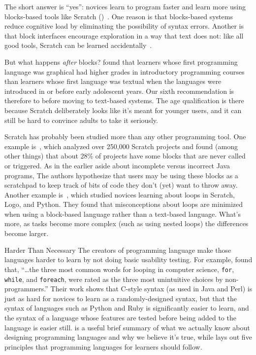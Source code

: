 
The short answer is ``yes'':
novices learn to program faster and learn more
using blocks-based tools like Scratch ()~\cite{Wein2017}.
One reason is that blocks-based systems reduce cognitive load by eliminating the possibility of syntax errors.
Another is that block interfaces encourage exploration in a way that text does not:
like all good tools,
Scratch can be learned accidentally~\cite{Malo2010}.

But what happens \emph{after} blocks?
\cite{Chen2018} found that learners whose first programming language was graphical
had higher grades in introductory programming courses
than learners whose first language was textual
when the languages were introduced in or before early adolescent years.
Our sixth recommendation is therefore to
before moving to text-based systems.
The age qualification is there because Scratch deliberately looks like it's meant for younger users,
and it can still be hard to convince adults to take it seriously.


Scratch has probably been studied more than any other programming tool.
One example is~\cite{Aiva2016},
which analyzed over 250,000 Scratch projects
and found (among other things) that about 28\% of projects have some blocks that are never called or triggered.
As in the earlier aside about incomplete versus incorrect Java programs,
The authors hypothesize that users may be using these blocks as a scratchpad
to keep track of bits of code they don't (yet) want to throw away.
Another example is~\cite{Grov2017,Mlad2017},
which studied novices learning about loops in Scratch, Logo, and Python.
They found that misconceptions about loops are minimized when using a block-based language
rather than a text-based language.
What's more,
as tasks become more complex (such as using nested loops)
the differences become larger.

\begin{aside}{Harder Than Necessary}
  The creators of programming language make those languages harder to learn by not doing basic usability testing.
  For example,
  \cite{Stef2013} found that,
  ``{\ldots}the three most common words for looping in computer science,
  \texttt{for}, \texttt{while}, and \texttt{foreach},
  were rated as the three most unintuitive choices by non-programmers.''
  Their work shows that C-style syntax (as used in Java and Perl)
  is just as hard for novices to learn as a randomly-designed syntax,
  but that the syntax of languages such as Python and Ruby is significantly easier to learn,
  and the syntax of a language whose features are tested before being added to the language is easier still.
  \cite{Stef2017} is a useful brief summary of what we actually know about designing programming languages
  and why we believe it's true,
  while \cite{Guzd2016} lays out five principles that programming languages for learners should follow.
\end{aside}

